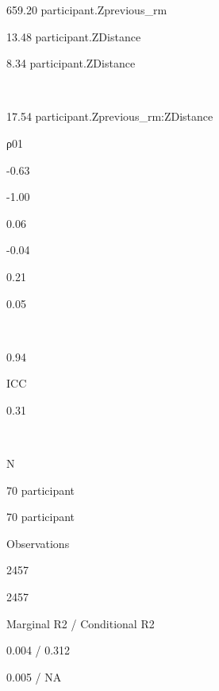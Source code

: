 \documentclass[
]{article}
\begin{document}
659.20 participant.Zprevious\_rm

13.48 participant.ZDistance

8.34 participant.ZDistance

~

17.54 participant.Zprevious\_rm:ZDistance

ρ01

-0.63

-1.00

0.06

-0.04

0.21

0.05

~

0.94

ICC

0.31

~

N

70 participant

70 participant

Observations

2457

2457

Marginal R2 / Conditional R2

0.004 / 0.312

0.005 / NA
\end{document}
